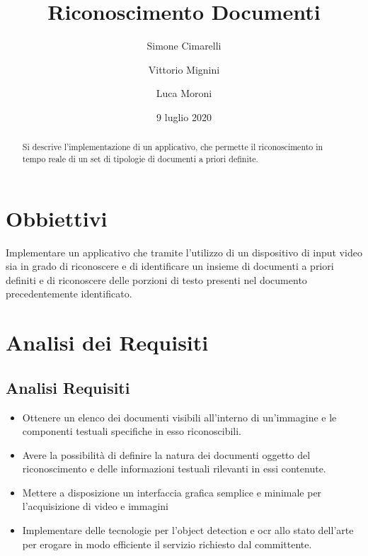 \documentclass[12pt,a4paper]{article}
\begin{document}
\title{Riconoscimento Documenti}
\author{Simone Cimarelli \and Vittorio Mignini \and Luca Moroni}
\date{9 luglio 2020}

\maketitle

\begin{abstract}
    Si descrive l'implementazione di un applicativo, che permette il
    riconoscimento in tempo reale di un set di tipologie di documenti a
    priori definite.
\end{abstract}

\section{Obbiettivi}

Implementare un applicativo che tramite l'utilizzo di un dispositivo di
input video sia in grado di riconoscere e di identificare un insieme di
documenti a priori definiti e di riconoscere delle porzioni di testo
presenti nel documento precedentemente identificato.

\section{Analisi dei Requisiti}

\subsection{Analisi Requisiti}

\begin{itemize}
    \item Ottenere un elenco dei documenti visibili all'interno di
        un'immagine e le componenti testuali specifiche in esso
        riconoscibili.
    \item Avere la possibilità di definire la natura dei documenti
        oggetto del riconoscimento e delle informazioni testuali
        rilevanti in essi contenute.
    \item Mettere a disposizione un interfaccia grafica semplice e
        minimale per l'acquisizione di video e immagini

    \item Implementare delle tecnologie per l'object detection e ocr
        allo stato dell'arte per erogare in modo efficiente il servizio
        richiesto dal committente.
\end{itemize}
\end{document}
